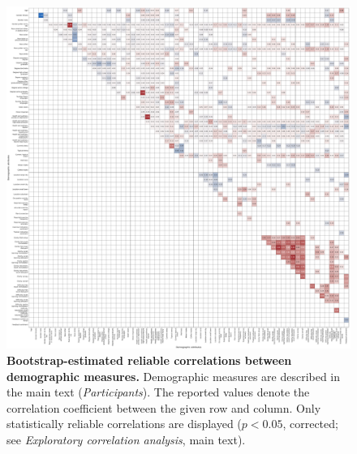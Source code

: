 \documentclass[10pt]{article}
\begin{document}
\begin{figure}[p]
\centering
\includegraphics[width=\textwidth]{figs/survey_survey_correlations}
\caption{\textbf{Bootstrap-estimated reliable correlations between
    demographic measures.}  Demographic measures are described in the
  main text (\textit{Participants}).  The reported values denote the correlation coefficient between the
given row and column.  Only statistically reliable correlations are
displayed ($p < 0.05$, corrected; see \textit{Exploratory correlation
  analysis}, main text).}
\label{fig:survey_corrs}
\end{figure}
\end{document}
